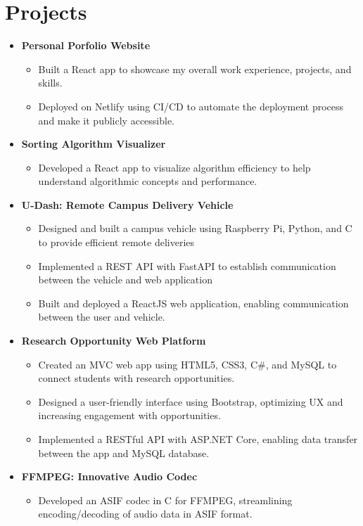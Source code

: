 \documentclass[letterpaper,11pt]{article}
\begin{document}
\section{\textbf{Projects}}
\begin{itemize}[leftmargin=0.05in, label={}]
	\item{
	            \textbf{Personal Porfolio Website}
	            \begin{itemize} [label=$\bullet$]
		            \item{Built a React app to showcase my overall work experience, projects, and skills.}
		            \item {Deployed on Netlify using CI/CD to automate the deployment process and make it publicly accessible.}
	            \end{itemize}
	      }
	\item{
	            \textbf{Sorting Algorithm Visualizer}
	            \begin{itemize} [label=$\bullet$]
		            \item{Developed a React app to visualize algorithm efficiency to help understand algorithmic concepts and performance.}
	            \end{itemize}
	      }
	\item{
	            \textbf{U-Dash: Remote Campus Delivery Vehicle}
	            \begin{itemize} [label=$\bullet$]
		            \item{Designed and built a campus vehicle using Raspberry Pi, Python, and C to provide efficient remote deliveries}
		            \item {Implemented a REST API with FastAPI to establish  communication between the vehicle and web application}
		                  \item{Built and deployed a ReactJS web application, enabling communication between the user and vehicle.}

	            \end{itemize}
	      }
	\item{
	            \textbf{Research Opportunity Web Platform}
	            \begin{itemize} [label=$\bullet$]
		            \item{Created an MVC web app using HTML5, CSS3, C\#, and MySQL to connect students with research opportunities.}
		            \item{Designed a user-friendly interface using Bootstrap, optimizing UX and increasing engagement with opportunities.}
		            \item{Implemented a RESTful API with ASP.NET Core, enabling data transfer between the app and MySQL database.}
	            \end{itemize}
	      }
	\item{
	            \textbf{FFMPEG: Innovative Audio Codec}
	            \begin{itemize} [label=$\bullet$]
		            \item{Developed an ASIF codec in C for FFMPEG, streamlining encoding/decoding of audio data in ASIF format.}
	            \end{itemize}
	      }


\end{itemize}
\end{document}
